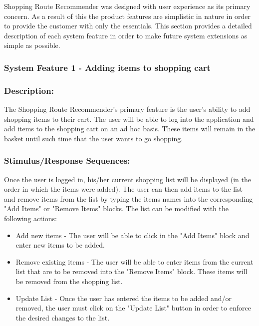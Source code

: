 \documentclass[10pt,twocolumn]{witseiepaper}
\begin{document}
		Shopping Route Recommender was designed with user experience as its primary concern. As a result of this the product features are simplistic in nature in order to provide the customer with only the essentials.	This section provides a detailed description of each system feature in order to make future system extensions as simple as possible. 
		
		\subsubsection{System Feature 1 - Adding items to shopping cart}
		\label{featureadd}
		
		\subsubsection*{Description:}
		
		The Shopping Route Recommender's primary feature is the user's ability to add shopping items to their cart. The user will be able to log into the application and add items to the shopping cart on an ad hoc basis. These items will remain in the basket until such time that the user wants to go shopping. 
		
		\subsubsection*{Stimulus/Response Sequences:}
		
		Once the user is logged in, his/her current shopping list will be displayed (in the order in which the items were added). The user can then add items to the list and remove items from the list by typing the items names into the corresponding "Add Items" or "Remove Items" blocks. The list can be modified with the following actions:
		
		\begin{itemize}
			\item Add new items - The user will be able to click in the "Add Items" block and enter new items to be added. 
			\item Remove existing items - The user will be able to enter items from the current list that are to be removed into the "Remove Items" block. These items will be removed from the shopping list.
			\item Update List - Once the user has entered the items to be added and/or removed, the user must click on the "Update List" button in order to enforce the desired changes to the list.
		\end{itemize}
		
\end{document}
